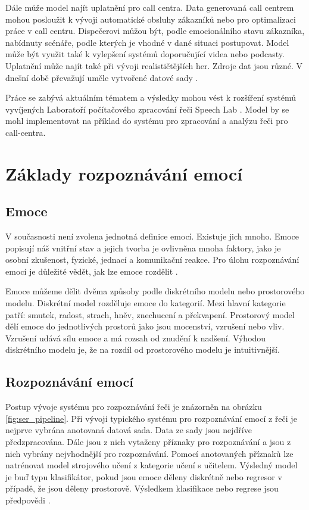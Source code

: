 \documentclass[FM,BP]{tulthesis}
\begin{document}
Dále může model najít uplatnění pro call centra. Data generovaná call centrem mohou posloužit k vývoji automatické obsluhy zákazníků nebo pro optimalizaci práce v call centru. Dispečerovi můžou být, podle emocionálního stavu zákazníka, nabídnuty scénáře, podle kterých je vhodné v dané situaci postupovat. Model může být využit také k vylepšení systémů doporučující videa nebo podcasty. Uplatnění může najít také při vývoji realističtějších her. Zdroje dat jsou různé. V dnešní době převažují uměle vytvořené datové sady \cite{konar_chakraborty_2015}.

Práce se zabývá aktuálním tématem a výsledky mohou vést k rozšíření systémů vyvíjených Laboratoří počítačového zpracování řeči Speech Lab \cite{speechlab}. Model by se mohl implementovat na příklad do systému pro zpracování a analýzu řeči pro call-centra.

\chapter{Základy rozpoznávání emocí}

\section{Emoce} %
V současnosti není zvolena jednotná definice emocí. Existuje jich mnoho. Emoce popisují náš vnitřní stav a jejich tvorba je ovlivněna mnoha faktory, jako je osobní zkušenost, fyzické, jednací a komunikační reakce. Pro úlohu rozpoznávání emocí je důležité vědět, jak lze emoce rozdělit \cite{DBLP:journals/speech/AkcayO20}.

Emoce můžeme dělit dvěma způsoby podle diskrétního modelu nebo prostorového modelu. Diskrétní model rozděluje emoce do kategorií. Mezi hlavní kategorie patří: smutek, radost, strach, hněv, znechucení a překvapení. Prostorový model dělí emoce do jednotlivých prostorů jako jsou mocenství, vzrušení nebo vliv. Vzrušení udává sílu emoce a má rozsah od znudění k nadšení. Výhodou diskrétního modelu je, že na rozdíl od prostorového modelu je intuitivnější. \cite{DBLP:journals/speech/AkcayO20}

\section{Rozpoznávání emocí} %
Postup vývoje systému pro rozpoznávání řeči je znázorněn na obrázku \ref{fig:ser_pipeline}. Při vývoji typického systému pro rozpoznávání emocí z řeči je nejprve vybrána anotovaná datová sada. Data ze sady jsou nejdříve předzpracována. Dále jsou z nich vytaženy příznaky pro rozpoznávání a jsou z nich vybrány nejvhodnější pro rozpoznávání. Pomocí anotovaných příznaků lze natrénovat model strojového učení z kategorie učení s učitelem. Výsledný model je buď typu klasifikátor, pokud jsou emoce děleny diskrétně nebo regresor v případě, že jsou děleny prostorově. Výsledkem klasifikace nebo regrese jsou předpovědi \cite{konar_chakraborty_2015}.
\end{document}
